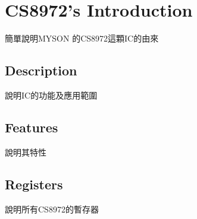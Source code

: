 \chapter{CS8972's Introduction}
簡單說明MYSON 的CS8972這顆IC的由來
	\section{Description}
	說明IC的功能及應用範圍
	
	\section{Features}
	說明其特性

	\section{Registers}
	說明所有CS8972的暫存器